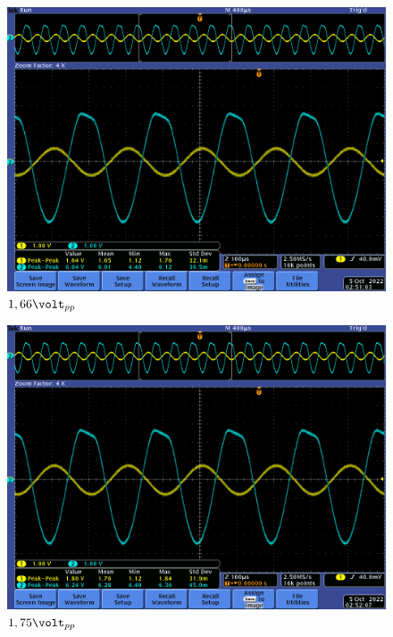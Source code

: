 \documentclass[12pt,letterpaper]{article}     %
\begin{document}
{\begin{figure}[!ht]
\centering
\includegraphics[scale=0.5]{imagenes/5.png}
\caption{$1,66\volt_{pp}$}
\label{fig:5}
\end{figure}

\begin{figure}[!ht]
\centering
\includegraphics[scale=0.5]{imagenes/6.png}
\caption{$1,75\volt_{pp}$}
\label{fig:6}
\end{figure}

}
\end{document}
